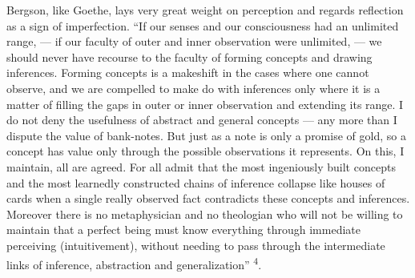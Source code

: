 \documentclass[12pt,a4paper,openany]{book}
\newcommand{\opage}[1]{\marginnote{\footnotesize\textit{[#1]}}}
\newcommand{\nm}[1]{\unskip\textsuperscript{#1}}
\begin{document}
Bergson, like Goethe, lays very great weight on perception and regards reflection as a sign of imperfection. ``If our senses and our consciousness had an unlimited range, --- if our faculty of outer and inner observation were unlimited, --- we should never have recourse to the faculty of forming concepts and drawing inferences. Forming concepts is a makeshift in the cases where one cannot observe, and we are compelled to make do with inferences only
\opage{6}where it is a matter of filling the gaps in outer or inner observation and extending its range. I do not deny the usefulness of abstract and general concepts --- any more than I dispute the value of bank-notes. But just as a note is only a promise of gold, so a concept has value only through the possible observations it represents. On this, I maintain, all are agreed. For all admit that the most ingeniously built concepts and the most learnedly constructed chains of inference collapse like houses of cards when a single really observed fact contradicts these concepts and inferences. Moreover there is no metaphysician and no theologian who will not be willing to maintain that a perfect being must know everything through immediate perceiving (intuitivement), without needing to pass through the intermediate links of inference, abstraction and generalization'' \nm{4}.
\end{document}
